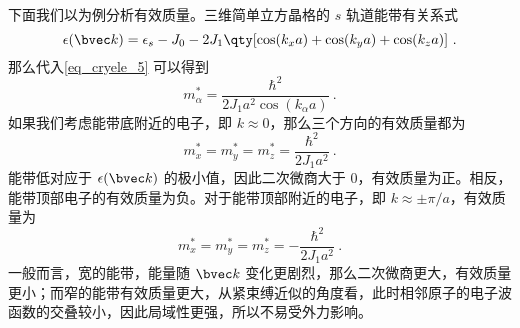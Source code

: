 下面我们以为例分析有效质量。三维简单立方晶格的 $s$ 轨道能带有关系式
\begin{equation}
\epsilon(\bvec k)=\epsilon_s-J_0-2J_1\qty[\cos(k_xa)+\cos(k_ya)+\cos(k_za)]~.
\end{equation}
那么代入\autoref{eq_cryele_5} 可以得到
\begin{equation}
m_\alpha^*=\frac{\hbar^2}{2 J_1 a^2\cos(k_\alpha a)}~.
\end{equation}
如果我们考虑能带底附近的电子，即 $k\approx 0$，那么三个方向的有效质量都为
\begin{equation}
m_x^*=m_y^*=m_z^*=\frac{\hbar^2}{2J_1a^2}~.
\end{equation}
能带低对应于 $\epsilon(\bvec k)$ 的极小值，因此二次微商大于 $0$，有效质量为正。相反，能带顶部电子的有效质量为负。对于能带顶部附近的电子，即 $k\approx \pm \pi/a$，有效质量为
\begin{equation}
m_x^*=m_y^*=m_z^*=-\frac{\hbar^2}{2J_1a^2}~.
\end{equation}
一般而言，宽的能带，能量随 $\bvec k$ 变化更剧烈，那么二次微商更大，有效质量更小；而窄的能带有效质量更大，从紧束缚近似的角度看，此时相邻原子的电子波函数的交叠较小，因此局域性更强，所以不易受外力影响。

